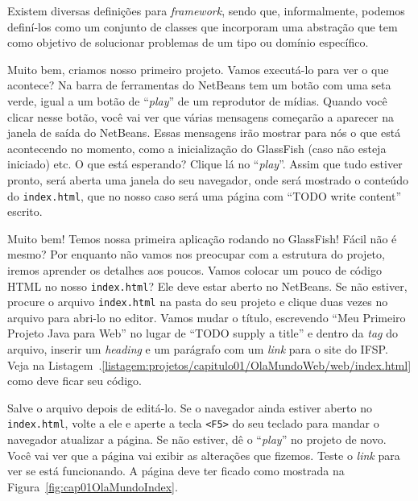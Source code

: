 \begin{saibaMais}
    Existem diversas definições para \textit{framework}, sendo que, informalmente, podemos definí-los como um conjunto de classes que incorporam uma abstração que tem como objetivo de solucionar problemas de um tipo ou domínio específico.
\end{saibaMais}

Muito bem, criamos nosso primeiro projeto. Vamos executá-lo para ver o que acontece? Na barra de ferramentas do NetBeans tem um botão com uma seta verde, igual a um botão de ``\textit{play}'' de um reprodutor de mídias. Quando você clicar nesse botão, você vai ver que várias mensagens começarão a aparecer na janela de saída do NetBeans. Essas mensagens irão mostrar para nós o que está acontecendo no momento, como a inicialização do GlassFish (caso não esteja iniciado) etc. O que está esperando? Clique lá no ``\textit{play}''. Assim que tudo estiver pronto, será aberta uma janela do seu navegador, onde será mostrado o conteúdo do \texttt{index.html}, que no nosso caso será uma página com ``TODO write content'' escrito.

Muito bem! Temos nossa primeira aplicação rodando no GlassFish! Fácil não é mesmo? Por enquanto não vamos nos preocupar com a estrutura do projeto, iremos aprender os detalhes aos poucos. Vamos colocar um pouco de código HTML no nosso \texttt{index.html}? Ele deve estar aberto no NetBeans. Se não estiver, procure o arquivo \texttt{index.html} na pasta  do seu projeto e clique duas vezes no arquivo para abri-lo no editor. Vamos mudar o título, escrevendo ``Meu Primeiro Projeto Java para Web'' no lugar de ``TODO supply a title'' e dentro da \textit{tag}  do arquivo, inserir um \textit{heading}  e um parágrafo com um \textit{link} para o site do IFSP. Veja na Listagem~\thechapter.\ref{listagem:projetos/capitulo01/OlaMundoWeb/web/index.html} como deve ficar seu código.


Salve o arquivo depois de editá-lo. Se o navegador ainda estiver aberto no \texttt{index.html}, volte a ele e aperte a tecla \texttt{<F5>} do seu teclado para mandar o navegador atualizar a página. Se não estiver, dê o ``\textit{play}'' no projeto de novo. Você vai ver que a página vai exibir as alterações que fizemos. Teste o \textit{link} para ver se está funcionando. A página deve ter ficado como mostrada na Figura~\ref{fig:cap01OlaMundoIndex}.

